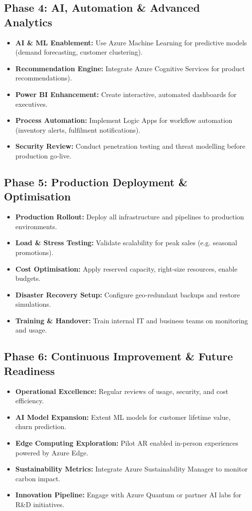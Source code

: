 \documentclass[12pt, a4paper, twoside]{article} %
\begin{document}
\subsection*{Phase 4: AI, Automation \& Advanced Analytics}
\begin{itemize}
\item \textbf{AI \& ML Enablement:} Use Azure Machine Learning for predictive models (demand forecasting, customer clustering).
\item \textbf{Recommendation Engine:} Integrate Azure Cognitive Services for product recommendations).
\item \textbf{Power BI Enhancement:} Create interactive, automated dashboards for executives.
\item \textbf{Process Automation:} Implement Logic Apps for workflow automation (inventory alerts, fulfilment notifications).
\item \textbf{Security Review:} Conduct penetration testing and threat modelling before production go-live.
\end{itemize}

\subsection*{Phase 5: Production Deployment \& Optimisation}
\begin{itemize}
\item \textbf{Production Rollout:} Deploy all infrastructure and pipelines to production environments.
\item \textbf{Load \& Stress Testing:} Validate scalability for peak sales (e.g. seasonal promotions).
\item \textbf{Cost Optimisation:} Apply reserved capacity, right-size resources, enable budgets.
\item \textbf{Disaster Recovery Setup:} Configure geo-redundant backups and restore simulations.
\item \textbf{Training \& Handover:} Train internal IT and business teams on monitoring and usage.
\end{itemize}

\subsection*{Phase 6: Continuous Improvement \& Future Readiness}
\begin{itemize}
\item \textbf{Operational Excellence:} Regular reviews of usage, security, and cost efficiency.
\item \textbf{AI Model Expansion:} Extent ML models for customer lifetime value, churn prediction.
\item \textbf{Edge Computing Exploration:} Pilot AR enabled in-person experiences powered by Azure Edge.
\item \textbf{Sustainability Metrics:} Integrate Azure Sustainability Manager to monitor carbon impact.
\item \textbf{Innovation Pipeline:} Engage with Azure Quantum or partner AI labs for R\&D initiatives. 
\end{itemize}
\end{document}
